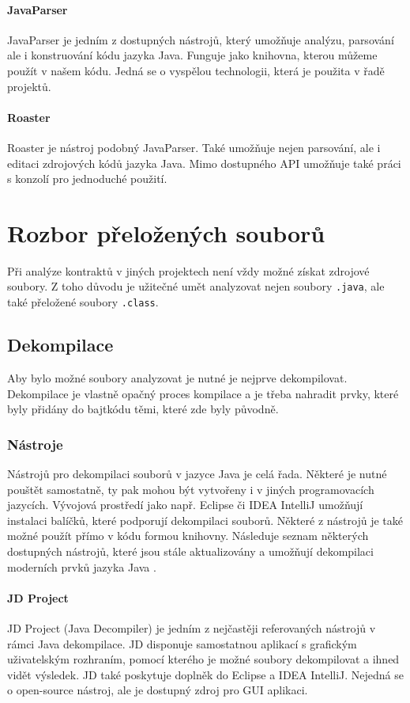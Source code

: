 			\paragraph{JavaParser}
				JavaParser \cite{javaparser} je jedním z dostupných nástrojů, který umožňuje analýzu, parsování ale i konstruování kódu jazyka Java. Funguje jako knihovna, kterou můžeme použít v našem kódu. Jedná se o vyspělou technologii, která je použita v řadě projektů. 
				
			\paragraph{Roaster}
				Roaster \cite{roaster} je nástroj podobný JavaParser. Také umožňuje nejen parsování, ale i editaci zdrojových kódů jazyka Java. Mimo dostupného API umožňuje také práci s konzolí  pro jednoduché použití.
	
	
	\section{Rozbor přeložených souborů}
		Při analýze kontraktů v jiných projektech není vždy možné získat zdrojové soubory. Z toho důvodu je užitečné umět analyzovat nejen soubory \texttt{.java}, ale také přeložené soubory \texttt{.class}.
	
		\subsection{Dekompilace}
			Aby bylo možné soubory analyzovat je nutné je nejprve dekompilovat. Dekompilace je vlastně opačný proces kompilace a je třeba nahradit prvky, které byly přidány do bajtkódu těmi, které zde byly původně.
			
			\subsubsection{Nástroje}
				Nástrojů pro dekompilaci souborů v jazyce Java je celá řada. Některé je nutné pouštět samostatně, ty pak mohou být vytvořeny i v jiných programovacích jazycích. Vývojová prostředí jako např. Eclipse či IDEA IntelliJ umožňují instalaci balíčků, které podporují dekompilaci souborů. Některé z nástrojů je také možné použít přímo v kódu formou knihovny. Následuje seznam některých dostupných nástrojů, které jsou stále aktualizovány a umožňují dekompilaci moderních prvků jazyka Java \cite{top8decompilers}\cite{decompilersOnline}\cite{quickDecompilers}.
				
				\paragraph{JD Project}
					JD Project (Java Decompiler) \cite{jd} je jedním z nejčastěji referovaných nástrojů v rámci Java dekompilace. JD disponuje samostatnou aplikací s grafickým uživatelským rozhraním, pomocí kterého je možné soubory dekompilovat a ihned vidět výsledek. JD také poskytuje doplněk do Eclipse a IDEA IntelliJ. Nejedná se o open-source nástroj, ale je dostupný zdroj pro GUI aplikaci.
					
